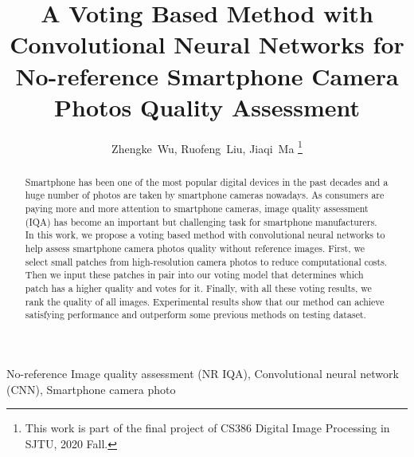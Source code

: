 \documentclass[journal]{IEEEtran}
\begin{document}
%
\title{A Voting Based Method with Convolutional Neural Networks for No-reference Smartphone Camera Photos Quality Assessment}
%
%
%

\author{Zhengke~Wu, Ruofeng~Liu, Jiaqi~Ma
\thanks{This work is part of the final project of CS386 Digital Image Processing in SJTU, 2020 Fall.}}

\maketitle

\begin{abstract}
Smartphone has been one of the most popular digital devices in the past decades and a huge number of photos are taken by smartphone cameras nowadays. As consumers are paying more and more attention to smartphone cameras, image quality assessment (IQA) has become an important but challenging task for smartphone manufacturers. In this work, we propose a voting based method with convolutional neural networks to help assess smartphone camera photos quality without reference images. First, we select small patches from high-resolution camera photos to reduce computational costs. Then we input these patches in pair into our voting model that determines which patch has a higher quality and votes for it. Finally, with all these voting results, we rank the quality of all images. Experimental results show that our method can achieve satisfying performance and outperform some previous methods on testing dataset. 
\end{abstract}

\begin{IEEEkeywords}
No-reference Image quality assessment (NR IQA), Convolutional neural network (CNN), Smartphone camera photo
\end{IEEEkeywords}
\end{document}
